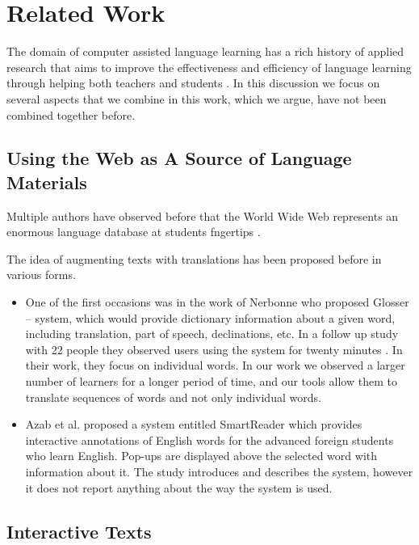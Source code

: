 \newpage
\section{Related Work}

The domain of computer assisted language learning has a rich history of applied research that aims to improve the effectiveness and efficiency of language learning through helping both teachers and students \cite{levy2013call}. In this discussion we focus on several aspects that we combine in this work, which we argue, have not been combined together before.


\subsection{Using the Web as A Source of Language Materials}

Multiple authors have observed before that the World Wide Web represents an enormous language database at students fngertips \cite{Fried08-Learner,Hira07-WebCorpora}.

The idea of augmenting texts with translations has been proposed before in various forms. 
\begin{itemize}
	\item One of the first occasions was in the work of Nerbonne \cite{Nerb99-Assistant} who proposed Glosser -- system, which would provide dictionary information about a given word, including translation, part of speech, declinations, etc. 
	In a follow up study with 22 people they observed users using the system for twenty minutes \cite{Dokter98-UserStudy}. In their work, they focus on individual words. In our work we observed a larger number of learners for a longer period of time, and our tools allow them to translate sequences of words and not only individual words. 
	\item Azab et al. \cite{Azab13-nlp} proposed a system entitled SmartReader which provides interactive annotations of English words for the advanced foreign students who learn English. Pop-ups are displayed above the selected word with information about it. The study introduces and describes the system, however it does not report anything about the way the system is used.

\end{itemize}



\subsection{Interactive Texts}

